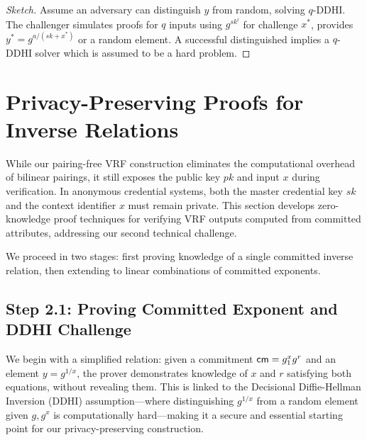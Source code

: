 \begin{proof}[Sketch]
    Assume an adversary can distinguish $y$ from random, solving $q$-DDHI. The challenger simulates proofs for $q$ inputs using $g^{sk^i}$ for challenge $x^*$, provides $y^* = g^{a/(sk + x^*)}$ or a random element. A successful distinguished implies a $q$-DDHI solver which is assumed to be a hard problem.
\end{proof}










\section{Privacy-Preserving Proofs for Inverse Relations}\label{sec:privacy-preserving-vrf}

While our pairing-free VRF construction eliminates the computational overhead of bilinear pairings, it still exposes the public key $pk$ and input $x$ during verification. In anonymous credential systems, both the master credential key $sk$ and the context identifier $x$ must remain private. This section develops zero-knowledge proof techniques for verifying VRF outputs computed from committed attributes, addressing our second technical challenge.

We proceed in two stages: first proving knowledge of a single committed inverse relation, then extending to linear combinations of committed exponents.


\subsection{Step 2.1: Proving Committed Exponent and DDHI Challenge}

We begin with a simplified relation: given a commitment $\mathsf{cm} = g_1^x g^r$ and an element $y = g^{1/x}$, the prover demonstrates knowledge of $x$ and $r$ satisfying both equations, without revealing them. This is linked to the Decisional Diffie-Hellman Inversion (DDHI) assumption—where distinguishing $g^{1/x}$ from a random element given $g, g^x$ is computationally hard—making it a secure and essential starting point for our privacy-preserving construction.


